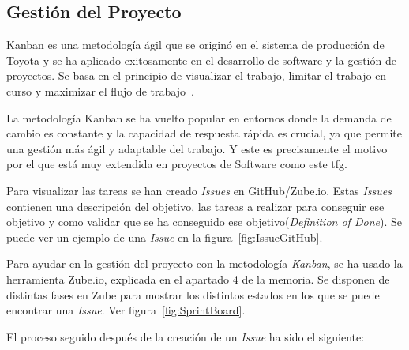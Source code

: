 \subsection{Gestión del Proyecto}

Kanban es una metodología ágil que se originó en el sistema de producción de Toyota y se ha aplicado exitosamente en el desarrollo de software y la gestión de proyectos. Se basa en el principio de visualizar el trabajo, limitar el trabajo en curso y maximizar el flujo de trabajo~\cite{Kanban}.

La metodología Kanban se ha vuelto popular en entornos donde la demanda de cambio es constante y la capacidad de respuesta rápida es crucial, ya que permite una gestión más ágil y adaptable del trabajo. Y este es precisamente el motivo por el que está muy extendida en proyectos de Software como este \acrshort{tfg}.

Para visualizar las tareas se han creado \textit{Issues} en GitHub/Zube.io. Estas \textit{Issues} contienen una descripción del objetivo, las tareas a realizar para conseguir ese objetivo y como validar que se ha conseguido ese objetivo(\textit{Definition of Done}). Se puede ver un ejemplo de una \textit{Issue} en la figura~\ref{fig:IssueGitHub}.


Para ayudar en la gestión del proyecto con la metodología \textit{Kanban}, se ha usado la herramienta Zube.io, explicada en el apartado 4 de la memoria. Se disponen de distintas fases en Zube para mostrar los distintos estados en los que se puede encontrar una \textit{Issue}. Ver figura~\ref{fig:SprintBoard}.

El proceso seguido después de la creación de un \textit{Issue} ha sido el siguiente:

